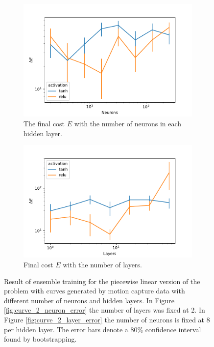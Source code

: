 \begin{figure}[t]\label{fig:curve_so3_pl_eks}
    \begin{subfigure}[t]{0.5\textwidth}
        \centering
        \includegraphics[width=\linewidth]{figures/curve_so3/pl_eks_6/neurons_error.pdf}
        \caption{The final cost \(E\) with the number of neurons in each hidden layer.}
        \label{fig:curve_so3_pl_neuron_error}
    \end{subfigure}
    \begin{subfigure}[t]{0.5\textwidth}
        \centering
        \includegraphics[width=\linewidth]{figures/curve_so3/pl_eks_6/layer_error.pdf}
        \caption{Final cost \(E\) with the number of layers.}
        \label{fig:curve_so3_pl_layer_error}
    \end{subfigure}
    \caption{Result of ensemble training for the piecewise linear version of the problem with curves generated by motion capture data with different number of neurons and hidden layers. In Figure \ref{fig:curve_2_neuron_error} the number of layers was fixed at 2. In Figure \ref{fig:curve_2_layer_error} the number of neurons is fixed at 8 per hidden layer. The error bars denote a 80\% confidence interval found by bootstrapping.}
\end{figure}

